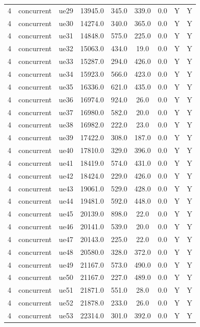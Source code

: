 \begin{table}[ht]
\begin{tabular}{|c|c|c|c|c|c|c|c|c|}
4 & concurrent & ue29 & 13945.0 & 345.0 & 339.0 & 0.0 & Y & Y \\
4 & concurrent & ue30 & 14274.0 & 340.0 & 365.0 & 0.0 & Y & Y \\
4 & concurrent & ue31 & 14848.0 & 575.0 & 225.0 & 0.0 & Y & Y \\
4 & concurrent & ue32 & 15063.0 & 434.0 & 19.0 & 0.0 & Y & Y \\
4 & concurrent & ue33 & 15287.0 & 294.0 & 426.0 & 0.0 & Y & Y \\
4 & concurrent & ue34 & 15923.0 & 566.0 & 423.0 & 0.0 & Y & Y \\
4 & concurrent & ue35 & 16336.0 & 621.0 & 435.0 & 0.0 & Y & Y \\
4 & concurrent & ue36 & 16974.0 & 924.0 & 26.0 & 0.0 & Y & Y \\
4 & concurrent & ue37 & 16980.0 & 582.0 & 20.0 & 0.0 & Y & Y \\
4 & concurrent & ue38 & 16982.0 & 222.0 & 23.0 & 0.0 & Y & Y \\
4 & concurrent & ue39 & 17422.0 & 308.0 & 187.0 & 0.0 & Y & Y \\
4 & concurrent & ue40 & 17810.0 & 329.0 & 396.0 & 0.0 & Y & Y \\
4 & concurrent & ue41 & 18419.0 & 574.0 & 431.0 & 0.0 & Y & Y \\
4 & concurrent & ue42 & 18424.0 & 229.0 & 426.0 & 0.0 & Y & Y \\
4 & concurrent & ue43 & 19061.0 & 529.0 & 428.0 & 0.0 & Y & Y \\
4 & concurrent & ue44 & 19481.0 & 592.0 & 448.0 & 0.0 & Y & Y \\
4 & concurrent & ue45 & 20139.0 & 898.0 & 22.0 & 0.0 & Y & Y \\
4 & concurrent & ue46 & 20141.0 & 539.0 & 20.0 & 0.0 & Y & Y \\
4 & concurrent & ue47 & 20143.0 & 225.0 & 22.0 & 0.0 & Y & Y \\
4 & concurrent & ue48 & 20580.0 & 328.0 & 372.0 & 0.0 & Y & Y \\
4 & concurrent & ue49 & 21167.0 & 573.0 & 490.0 & 0.0 & Y & Y \\
4 & concurrent & ue50 & 21167.0 & 227.0 & 489.0 & 0.0 & Y & Y \\
4 & concurrent & ue51 & 21871.0 & 551.0 & 28.0 & 0.0 & Y & Y \\
4 & concurrent & ue52 & 21878.0 & 233.0 & 26.0 & 0.0 & Y & Y \\
4 & concurrent & ue53 & 22314.0 & 301.0 & 392.0 & 0.0 & Y & Y \\

\end{tabular}
\end{table}
